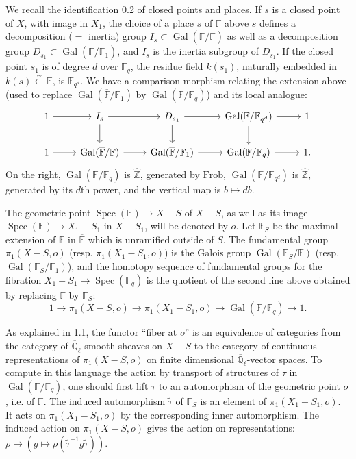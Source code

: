 \documentclass[11pt,a4paper]{article}
\theoremstyle{plain}
\theoremstyle{definition}
\DeclareMathOperator{\Spec}{Spec}
\DeclareMathOperator{\Gal}{Gal}
\newcommand{\Ql}{\overline{\mathbb{Q}}_\ell}
\newcommand{\Fq}{\mathbb{F}_q}
\newcommand{\F}{\mathbb{F}}
\newcommand{\Z}{\mathbb{Z}}
\newcommand{\Frob}{\mathrm{Frob}}
\begin{document}
We recall the identification 0.2 of closed points and places. If $s$ is a closed point of $X$, with image in $X_1$, the choice of a place $\bar{s}$ of $\overline{\mathbb{F}}$ above $s$ defines a decomposition ($=$ inertia) group $I_s \subset \Gal(\overline{\mathbb{F}}/\mathbb{F})$ as well as a decomposition group $D_{s_1} \subset \Gal(\overline{\mathbb{F}}/\mathbb{F}_1)$, and $I_s$ is the inertia subgroup of $D_{s_1}$. If the closed point $s_1$ is of degree $d$ over $\Fq$, the residue field $k(s_1)$, naturally embedded in $k(s) \xleftarrow{\sim} \F$, is $\F_{q^d}$. We have a comparison morphism relating the extension above (used to replace $\Gal(\overline{\mathbb{F}}/\mathbb{F}_1)$ by $\Gal(\F/\Fq)$) and its local analogue:
\begin{equation}
\begin{tikzcd}
1 \arrow[r] & I_s \arrow[r] \arrow[d] & D_{s_1} \arrow[r] \arrow[d] & \Gal(\F/\F_{q^d}) \arrow[r] \arrow[d] & 1 \\
1 \arrow[r] & \Gal(\overline{\mathbb{F}}/\mathbb{F}) \arrow[r] & \Gal(\overline{\mathbb{F}}/\mathbb{F}_1) \arrow[r] & \Gal(\F/\Fq) \arrow[r] & 1.
\end{tikzcd}
\end{equation}
On the right, $\Gal(\F/\Fq)$ is $\hat{\Z}$, generated by $\Frob$, $\Gal(\F/\F_{q^d})$ is $\hat{\Z}$, generated by its $d$th power, and the vertical map is $b \mapsto db$.

The geometric point $\Spec(\F) \to X - S$ of $X - S$, as well as its image $\Spec(\F) \to X_1 - S_1$ in $X - S_1$, will be denoted by $o$. Let $\mathbb{F}_S$ be the maximal extension of $\mathbb{F}$ in $\overline{\mathbb{F}}$ which is unramified outside of $S$. The fundamental group $\pi_1(X - S, o)$ (resp. $\pi_1(X_1 - S_1, o)$) is the Galois group $\Gal(\mathbb{F}_S/\mathbb{F})$ (resp. $\Gal(\mathbb{F}_S/\mathbb{F}_1)$), and the homotopy sequence of fundamental groups for the fibration $X_1 - S_1 \to \Spec(\Fq)$ is the quotient of the second line above obtained by replacing $\overline{\mathbb{F}}$ by $\mathbb{F}_S$:
\begin{equation}
1 \to \pi_1(X - S, o) \to \pi_1(X_1 - S_1, o) \to \Gal(\F/\Fq) \to 1.
\end{equation}

As explained in 1.1, the functor ``fiber at $o$'' is an equivalence of categories from the category of $\Ql$-smooth sheaves on $X - S$ to the category of continuous representations of $\pi_1(X - S, o)$ on finite dimensional $\Ql$-vector spaces. To compute in this language the action by transport of structures of $\tau$ in $\Gal(\F/\Fq)$, one should first lift $\tau$ to an automorphism of the geometric point $o$, i.e. of $\F$. The induced automorphism $\tilde{\tau}$ of $\mathbb{F}_S$ is an element of $\pi_1(X_1 - S_1, o)$. It acts on $\pi_1(X_1 - S_1, o)$ by the corresponding inner automorphism. The induced action on $\pi_1(X - S, o)$ gives the action on representations: $\rho \mapsto (g \mapsto \rho(\tilde{\tau}^{-1} g \tilde{\tau}))$.
\end{document}
